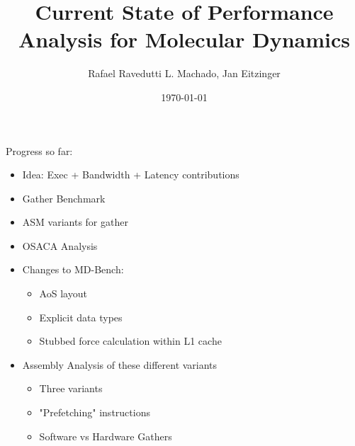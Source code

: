 \documentclass[aspectratio=43,t]{beamer}
\title[MD Performance Analysis]{Current State of Performance Analysis for Molecular Dynamics}
\author[Rafael Ravedutti L. Machado, Jan Eitzinger]{Rafael Ravedutti L. Machado, Jan Eitzinger}
\institute[NHR@FAU]{Erlangen National High Performance Computing Center (NHR@FAU)}
\date{\today}
\begin{document}
  \maketitle

  { %
    \begin{frame}[noframenumbering]{Progress so far:}
        \begin{itemize}
            \item Idea: Exec + Bandwidth + Latency contributions
            \item Gather Benchmark
            \item ASM variants for gather
            \item OSACA Analysis
            \item Changes to MD-Bench:
            \begin{itemize}
                \item AoS layout
                \item Explicit data types
                \item Stubbed force calculation within L1 cache
            \end{itemize}
            \item Assembly Analysis of these different variants
            \begin{itemize}
                \item Three variants
                \item "Prefetching" instructions
                \item Software vs Hardware Gathers
            \end{itemize}
        \end{itemize}
    \end{frame}
  }

\end{document}
